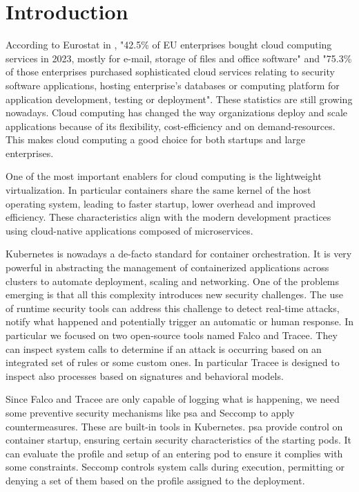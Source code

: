 \section{Introduction}
\label{sec:intro}

According to Eurostat in \cite{eurostat}, "42.5\% of EU enterprises bought cloud computing services in 2023, mostly for e-mail, storage of files and office software" and "75.3\% of those enterprises purchased sophisticated cloud services relating to security software applications, hosting enterprise’s databases or computing platform for application development, testing or deployment". These statistics are still growing nowadays. Cloud computing has changed the way organizations deploy and scale applications because of its flexibility, cost-efficiency and on demand-resources. This makes cloud computing a good choice for both startups and large enterprises.

One of the most important enablers for cloud computing is the lightweight virtualization. In particular containers share the same kernel of the host operating system, leading to faster startup, lower overhead and improved efficiency. These characteristics align with the modern development practices using cloud-native applications composed of microservices.

Kubernetes \cite{kubernetes} is nowadays a de-facto standard for container orchestration. It is very powerful in abstracting the management of containerized applications across clusters to automate deployment, scaling and networking. One of the problems emerging is that all this complexity introduces new security challenges. The use of runtime security tools can address this challenge to detect real-time attacks, notify what happened and potentially trigger an automatic or human response. In particular we focused on two open-source tools named Falco and Tracee. They can inspect system calls to determine if an attack is occurring based on an integrated set of rules or some custom ones. In particular Tracee is designed to inspect also processes based on signatures and behavioral models.

Since Falco and Tracee are only capable of logging what is happening, we need some preventive security mechanisms like \ac{psa} and Seccomp to apply countermeasures. These are built-in tools in Kubernetes. \Ac{psa} provide control on container startup, ensuring certain security characteristics of the starting pods. It can evaluate the profile and setup of an entering pod to ensure it complies with some constraints. Seccomp controls system calls during execution, permitting or denying a set of them based on the profile assigned to the deployment.

